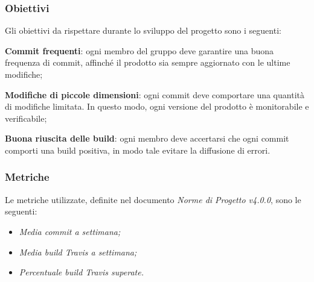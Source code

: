 \subsubsection{Obiettivi} 
Gli obiettivi da rispettare durante lo sviluppo del progetto sono i seguenti:
\begin{itemize}
	\item{\textbf{Commit frequenti}: ogni membro del gruppo deve garantire una buona frequenza di commit, affinché il prodotto sia sempre aggiornato con le ultime modifiche;
	\item{\textbf{Modifiche di piccole dimensioni}: ogni commit deve comportare una quantità di modifiche limitata. In questo modo, ogni versione del prodotto è monitorabile e verificabile;}
	\item{\textbf{Buona riuscita delle build}: ogni membro deve accertarsi che ogni commit comporti una build positiva, in modo tale evitare la diffusione di errori.}
	}
\end{itemize}
\subsubsection{Metriche}
Le metriche utilizzate, definite nel documento \emph{Norme di Progetto v4.0.0}, sono le seguenti:
\begin{itemize}
	\item\emph{Media commit a settimana;}
	\item\emph{Media build Travis a settimana;}
	\item\emph{Percentuale build Travis superate.}
\end{itemize}

